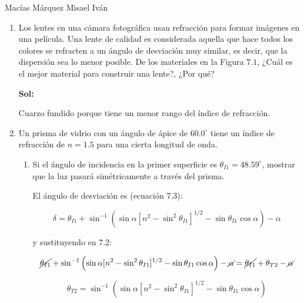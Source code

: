 \documentclass[12pt,a4paper]{article}
\begin{document}
Macías Márquez Misael Iván

\begin{enumerate}






\item Los lentes en una cámara fotográfica usan refracción para formar imágenes en una película. Una lente de calidad es considerada aquella que hace todos los colores se refracten a un ángulo de desviación muy similar, es decir, que la dispersión sea lo menor posible. De los materiales en la Figura $7.1$, ¿Cuál es el mejor material para construir una lente?, ¿Por qué?

\textbf{Sol:}

Cuarzo fundido porque tiene un menor rango del índice de refracción.







\item Un prisma de vidrio con un ángulo de ápice de $60.0^{\circ}$ tiene un índice de refracción de $n=1.5$ para una  cierta longitud de onda.

\begin{enumerate}
    \item Si el ángulo de incidencia en la primer superficie es $\theta_{I1} = 48.59^{\circ}$, mostrar que la luz pasará simétricamente a través del prisma.
    
    El ángulo de desviación es (ecuación 7.3):
    
    \begin{equation*}
        \delta = \theta_{I1}+ \sin^{-1}{\left(\sin{\alpha}[n^2-\sin^{2}{\theta_{I1}}]^{1/2}-\sin{\theta_{I1}\cos{\alpha}}\right)}-\alpha 
    \end{equation*}
    
    y sustituyendo en 7.2:
    
    \begin{equation*}
         \cancel{\theta_{I1}}+ \sin^{-1}{\left(\sin{\alpha}[n^2-\sin^{2}{\theta_{I1}}]^{1/2}-\sin{\theta_{I1}\cos{\alpha}}\right)}-\cancel{\alpha}= \cancel{\theta_{I1}}+\theta_{T2}-\cancel{\alpha}
    \end{equation*}
    
    \begin{equation*}
        \theta_{T2} = \sin^{-1}{\left(\sin{\alpha}[n^2-\sin^{2}{\theta_{I1}}]^{1/2}-\sin{\theta_{I1}\cos{\alpha}}\right)}
    \end{equation*}
    

\end{enumerate}
\end{enumerate}
\end{document}
